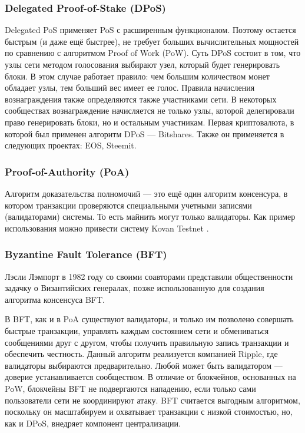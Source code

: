 \subsubsection{Delegated Proof-of-Stake (DPoS)}
Delegated PoS применяет PoS с расширенным функционалом. Поэтому остается
быстрым (и даже ещё быстрее), не требует больших вычислительных мощностей по
сравнению с алгоритмом Proof of Work (PoW). Суть DPoS состоит в том, что узлы
сети методом голосования выбирают узел, который будет генерировать блоки. В
этом случае работает правило: чем большим количеством монет обладает узлы, тем
больший вес имеет ее голос. Правила начисления вознаграждения также
определяются также участниками сети. В некоторых сообществах вознаграждение
начисляется не только узлы, которой делегировали право генерировать блоки, но и
остальным участникам. Первая криптовалюта, в которой был применен алгоритм DPoS
--- Bitshares. Также он применяется в следующих проектах: EOS, Steemit.

\subsubsection{Proof-of-Authority (PoA)}
Алгоритм доказательства полномочий --- это ещё один алгоритм консенсура, в
котором транзакции проверяются специальными учетными записями (валидаторами)
системы. То есть майнить могут только валидаторы. Как пример использования
можно привести систему Kovan Testnet \cite{Etherium2018}.

\subsubsection{Byzantine Fault Tolerance (BFT)}
Лэсли Лэмпорт в 1982 году \cite{Lamport2002} со своими соавторами представили
общественности задачку о Византийских генералах, позже использованную для
создания алгоритма консенсуса BFT.

В BFT, как и в PoA существуют валидаторы, и только им позволено совершать
быстрые транзакции, управлять каждым состоянием сети и обмениваться сообщениями
друг с другом, чтобы получить правильную запись транзакции и обеспечить
честность. Данный алгоритм реализуется компанией Ripple, где валидаторы
выбираются предварительно. Любой может быть валидатором --- доверие
устанавливается сообществом. В отличие от блокчейнов, основанных на PoW,
блокчейны BFT не подвергаются нападению, если только сами пользователи сети не
координируют атаку. BFT считается выгодным алгоритмом, поскольку он
масштабируем и охватывает транзакции с низкой стоимостью, но, как и DPoS,
внедряет компонент централизации.


